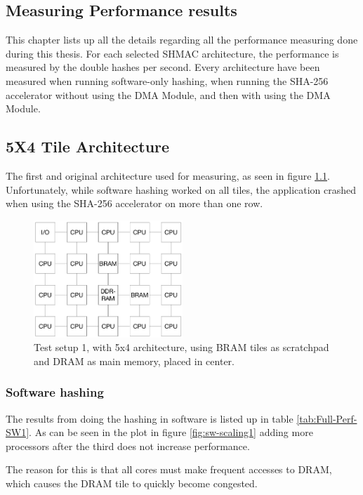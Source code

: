 \begin{appendix}
\chapter{Measuring Performance results}

This chapter lists up all the details regarding all the performance measuring done during this thesis.
For each selected SHMAC architecture, the performance is measured by the double hashes per second.
Every architecture have been measured when running software-only hashing, when running the SHA-256 accelerator without using the DMA Module, and then with using the DMA Module. 

\section{5X4 Tile Architecture}

The first and original architecture used for measuring, as seen in figure \ref{fig:5x4-2}.
Unfortunately, while software hashing worked on all tiles, the application crashed when using the SHA-256 accelerator on more than one row.

\begin{figure}[htb]
    \centering
    \includegraphics[width=0.5\textwidth]{Figures/Measurements/5x4}
    \caption{Test setup 1, with 5x4 architecture, using BRAM tiles as scratchpad and DRAM as main memory, placed in center.}
    \label{fig:5x4-2}
\end{figure}

\subsection{Software hashing}

The results from doing the hashing in software is listed up in table \ref{tab:Full-Perf-SW1}. 
As can be seen in the plot in figure \ref{fig:sw-scaling1} adding more processors after the third does not increase performance.

The reason for this is that all cores must make frequent accesses to DRAM, which causes the
DRAM tile to quickly become congested.


\end{appendix}
